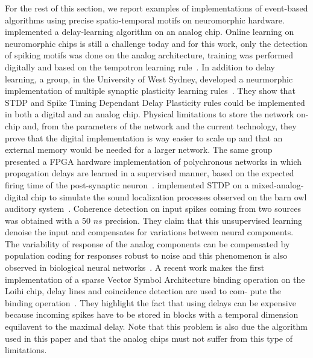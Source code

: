 \documentclass[brainsci, %
               review,submit,pdftex,moreauthors
               ]{Definitions/mdpi}
\begin{document}
For the rest of this section, we report examples of implementations of event-based algorithms using precise spatio-temporal motifs on neuromorphic hardware. 
\citep{hussain_deltron_2012} implemented a delay-learning algorithm on an analog chip. Online learning on neuromorphic chips is still a challenge today and for this work, only the detection of spiking motifs was done on the analog architecture, training was performed digitally and based on the tempotron learning rule~\citep{gutig_tempotron_2006}. In addition to delay learning, a group, in the University of West Sydney, developed a neurmorphic implementation of multiple synaptic plasticity learning rules~\citep{wang_neuromorphic_2015}. They show that STDP and Spike Timing Dependant Delay Plasticity rules could be implemented in both a digital and an analog chip. Physical limitations to store the network on-chip and, from the parameters of the network and the current technology, they prove that the digital implementation is way easier to scale up and that an external memory would be needed for a larger network. The same group presented a FPGA hardware implementation of polychronous networks in which propagation delays are learned in a supervised manner, based on the expected firing time of the post-synaptic neuron~\citet{wang_fpga_2013}. %
\citep{pfeil_neuromorphic_2013} implemented STDP on a mixed-analog-digital chip to simulate the sound localization processes observed on the barn owl auditory system~\citep{gerstner_neuronal_1996}. Coherence detection on input spikes coming from two sources was obtained with a 50 $ns$ precision. They claim that this unsupervised learning denoise the input and compensates for variations between neural components. The variability of response of the analog components can be compensated by population coding for responses robust to noise and this phenomenon is also observed in biological neural networks~\citep{boerlin_spike-based_2011}. 
A recent work makes the first implementation of a sparse Vector Symbol Architecture binding operation on the Loihi chip, delay lines and coincidence detection are used to com-
pute the binding operation~\citep{renner_sparse_2022}. They highlight the fact that using delays can be expensive because incoming spikes have to be stored in blocks with a temporal dimension equilavent to the maximal delay. Note that this problem is also due the algorithm used in this paper and that the analog chips must not suffer from this type of limitations. 
\end{document}
